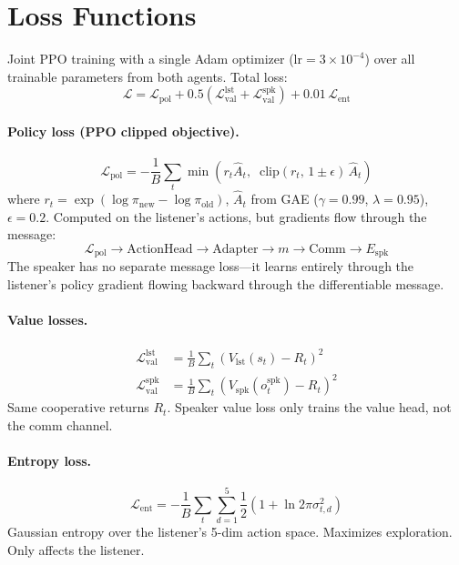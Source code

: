 \documentclass[11pt,a4paper]{article}
\begin{document}
\section{Loss Functions}

Joint PPO training with a single Adam optimizer ($\mathrm{lr}{=}3{\times}10^{-4}$) over all trainable parameters from both agents. Total loss:
\begin{equation}
    \mathcal{L} = \mathcal{L}_{\mathrm{pol}} + 0.5\left(\mathcal{L}_{\mathrm{val}}^{\mathrm{lst}} + \mathcal{L}_{\mathrm{val}}^{\mathrm{spk}}\right) + 0.01\,\mathcal{L}_{\mathrm{ent}}
\end{equation}

\paragraph{Policy loss (PPO clipped objective).}
\begin{equation}
    \mathcal{L}_{\mathrm{pol}} = -\frac{1}{B}\sum_t \min\!\left(r_t \hat{A}_t,\;\; \mathrm{clip}(r_t,\, 1{\pm}\epsilon)\,\hat{A}_t\right)
\end{equation}
where $r_t = \exp(\log\pi_{\mathrm{new}} - \log\pi_{\mathrm{old}})$, $\hat{A}_t$ from GAE ($\gamma{=}0.99$, $\lambda{=}0.95$), $\epsilon{=}0.2$. Computed on the listener's actions, but gradients flow through the message:
\begin{equation}
    \mathcal{L}_{\mathrm{pol}} \to \text{ActionHead} \to \text{Adapter} \to m \to \text{Comm} \to E_{\mathrm{spk}} \nonumber
\end{equation}
The speaker has no separate message loss---it learns entirely through the listener's policy gradient flowing backward through the differentiable message.

\paragraph{Value losses.}
\begin{align}
    \mathcal{L}_{\mathrm{val}}^{\mathrm{lst}} &= \frac{1}{B}\sum_t \left(V_{\mathrm{lst}}(s_t) - R_t\right)^2 \\
    \mathcal{L}_{\mathrm{val}}^{\mathrm{spk}} &= \frac{1}{B}\sum_t \left(V_{\mathrm{spk}}(o_t^{\mathrm{spk}}) - R_t\right)^2
\end{align}
Same cooperative returns $R_t$. Speaker value loss only trains the value head, not the comm channel.

\paragraph{Entropy loss.}
\begin{equation}
    \mathcal{L}_{\mathrm{ent}} = -\frac{1}{B}\sum_t \sum_{d=1}^{5} \frac{1}{2}\!\left(1 + \ln 2\pi\sigma_{t,d}^2\right)
\end{equation}
Gaussian entropy over the listener's 5-dim action space. Maximizes exploration. Only affects the listener.
\end{document}
